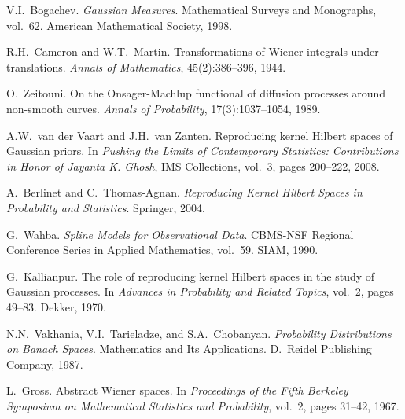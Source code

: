 \documentclass[11pt]{article}
\theoremstyle{definition}
\begin{document}
\begin{enumerate}[label={[\arabic*]}]
    \item V.I.~Bogachev. \emph{Gaussian Measures}. Mathematical Surveys and Monographs, vol.~62. American Mathematical Society, 1998.
    
    \item R.H.~Cameron and W.T.~Martin. Transformations of Wiener integrals under translations. \emph{Annals of Mathematics}, 45(2):386--396, 1944.
    
    \item O.~Zeitouni. On the Onsager-Machlup functional of diffusion processes around non-smooth curves. \emph{Annals of Probability}, 17(3):1037--1054, 1989.
    
    \item A.W.~van der Vaart and J.H.~van Zanten. Reproducing kernel Hilbert spaces of Gaussian priors. In \emph{Pushing the Limits of Contemporary Statistics: Contributions in Honor of Jayanta K. Ghosh}, IMS Collections, vol.~3, pages 200--222, 2008.
    
    \item A.~Berlinet and C.~Thomas-Agnan. \emph{Reproducing Kernel Hilbert Spaces in Probability and Statistics}. Springer, 2004.
    
    \item G.~Wahba. \emph{Spline Models for Observational Data}. CBMS-NSF Regional Conference Series in Applied Mathematics, vol.~59. SIAM, 1990.
    
    \item G.~Kallianpur. The role of reproducing kernel Hilbert spaces in the study of Gaussian processes. In \emph{Advances in Probability and Related Topics}, vol.~2, pages 49--83. Dekker, 1970.
    
    \item N.N.~Vakhania, V.I.~Tarieladze, and S.A.~Chobanyan. \emph{Probability Distributions on Banach Spaces}. Mathematics and Its Applications. D.~Reidel Publishing Company, 1987.
    
    \item L.~Gross. Abstract Wiener spaces. In \emph{Proceedings of the Fifth Berkeley Symposium on Mathematical Statistics and Probability}, vol.~2, pages 31--42, 1967.
\end{enumerate}
\end{document}
